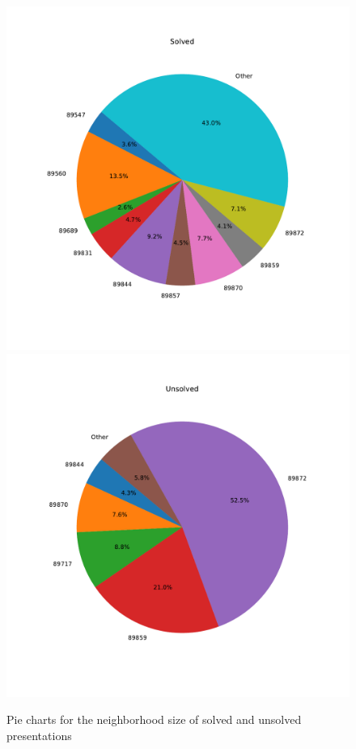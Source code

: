 \begin{figure}
	\centering
	\includegraphics[scale=.4]{fig/prime_solved_pie_cropped.pdf}
	\quad
	\includegraphics[scale=.4]{fig/prime_unsolved_pie_cropped.pdf}
	\caption{Pie charts for the neighborhood size of solved and unsolved presentations}
	\label{fig:prime_pies}
\end{figure}

